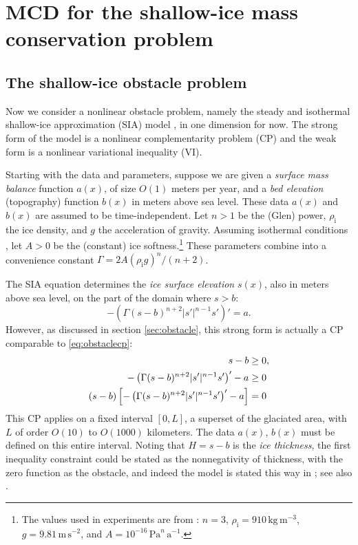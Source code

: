 \documentclass[letterpaper,final,12pt,reqno]{amsart}
\theoremstyle{claim}
\newcommand{\rhoi}{\rho_{\text{i}}}
\numberwithin{equation}{section}
\numberwithin{figure}{section}
\numberwithin{table}{section}
\numberwithin{theorem}{section}
\begin{document}
\section{MCD for the shallow-ice mass conservation problem} \label{sec:sia}

\subsection{The shallow-ice obstacle problem} \label{subsec:siaproblem}  Now we consider a nonlinear obstacle problem, namely the steady and isothermal shallow-ice approximation (SIA) model \cite{Bueleretal2005,Huybrechtsetal1996,vanderVeen2013}, in one dimension for now.  The strong form of the model is a nonlinear complementarity problem (CP) and the weak form is a nonlinear variational inequality (VI).

Starting with the data and parameters, suppose we are given a \emph{surface mass balance} function $a(x)$, of size $O(1)$ meters per year, and a \emph{bed elevation} (topography) function $b(x)$ in meters above sea level.  These data $a(x)$ and $b(x)$ are assumed to be time-independent.  Let $n>1$ be the (Glen) power, $\rhoi$ the ice density, and $g$ the acceleration of gravity.  Assuming isothermal conditions \cite{GreveBlatter2009}, let $A>0$ be the (constant) ice softness.\footnote{The values used in experiments are from \cite{Huybrechtsetal1996}: $n=3$, $\rhoi=910 \,\text{kg}\,\text{m}^{-3}$, $g=9.81 \,\text{m}\,\text{s}^{-2}$, and $A=10^{-16} \,\text{Pa}^n\,\text{a}^{-1}$.}  These parameters combine into a convenience constant $\Gamma = 2 A (\rhoi g)^n / (n+2)$.

The SIA equation determines the \emph{ice surface elevation} $s(x)$, also in meters above sea level, on the part of the domain where $s>b$:
\begin{equation}
- \left(\Gamma (s-b)^{n+2} |s'|^{n-1} s'\right)' = a.  \label{eq:sia}
\end{equation}
However, as discussed in section \ref{sec:obstacle}, this strong form is actually a CP comparable to \eqref{eq:obstaclecp}:
\begin{align}
s - b &\ge 0, \label{eq:siacp} \\
- \left(\Gamma (s-b)^{n+2} |s'|^{n-1} s'\right)' - a &\ge 0 \notag \\
(s-b) \left[-\left(\Gamma (s-b)^{n+2} |s'|^{n-1} s'\right)' - a\right] &= 0 \notag
\end{align}
This CP applies on a fixed interval $[0,L]$, a superset of the glaciated area, with $L$ of order $O(10)$ to $O(1000)$ kilometers.  The data $a(x)$, $b(x)$ must be defined on this entire interval.  Noting that $H=s-b$ is the \emph{ice thickness}, the first inequality constraint could be stated as the nonnegativity of thickness, with the zero function as the obstacle, and indeed the model is stated this way in \cite{Bueler2016,JouvetBueler2012, Jouvetetal2013,JouvetGraeser2013}; see also \cite{Bueler2020}.
\end{document}
